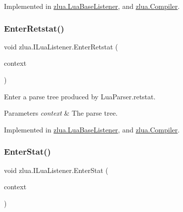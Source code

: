Implemented in \mbox{\hyperlink{classzlua_1_1_lua_base_listener_ac17b7407bccd562c7786ef788558e767}{zlua.\+Lua\+Base\+Listener}}, and \mbox{\hyperlink{classzlua_1_1_compiler_a275bfb29b3cb0fd2322f2a58d6de2e22}{zlua.\+Compiler}}.

\mbox{\label{interfacezlua_1_1_i_lua_listener_a0035b00baa60225e9b546903bf41835e}} 
\subsubsection{\texorpdfstring{Enter\+Retstat()}{EnterRetstat()}}
{\footnotesize\ttfamily void zlua.\+I\+Lua\+Listener.\+Enter\+Retstat (\begin{DoxyParamCaption}\item[{\mbox{[}\+Not\+Null\mbox{]} \mbox{\hyperlink{classzlua_1_1_lua_parser_1_1_retstat_context}{Lua\+Parser.\+Retstat\+Context}}}]{context }\end{DoxyParamCaption})}



Enter a parse tree produced by Lua\+Parser.\+retstat. 


\begin{DoxyParams}{Parameters}
{\em context} & The parse tree.\\
\hline
\end{DoxyParams}


Implemented in \mbox{\hyperlink{classzlua_1_1_lua_base_listener_a48c1d90a5dbcce92c8f3f30e7a413f25}{zlua.\+Lua\+Base\+Listener}}, and \mbox{\hyperlink{classzlua_1_1_compiler_aee24dcb3e97d2fc95ec9c970867c8876}{zlua.\+Compiler}}.

\mbox{\label{interfacezlua_1_1_i_lua_listener_a4d0313123030b6de6c2e4b63a00bb66f}} 
\subsubsection{\texorpdfstring{Enter\+Stat()}{EnterStat()}}
{\footnotesize\ttfamily void zlua.\+I\+Lua\+Listener.\+Enter\+Stat (\begin{DoxyParamCaption}\item[{\mbox{[}\+Not\+Null\mbox{]} \mbox{\hyperlink{classzlua_1_1_lua_parser_1_1_stat_context}{Lua\+Parser.\+Stat\+Context}}}]{context }\end{DoxyParamCaption})}




